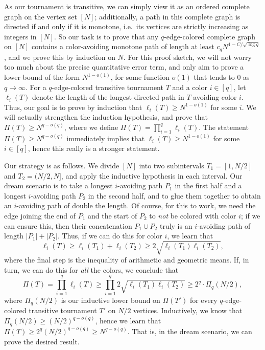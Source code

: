 \documentclass[11pt,reqno]{amsart}
\theoremstyle{definition}
\newcommand\ab[1]{\lvert#1\rvert}
\newcommand\1{\mathbf{1}}
\let\geq\geqslant
\begin{document}
As our tournament is transitive, we can simply view it as an ordered complete graph on the vertex set $[N]$; additionally, a path in this complete graph is directed if and only if it is monotone, i.e.\ its vertices are strictly increasing as integers in $[N]$. So our task is to prove that any $q$-edge-colored complete graph on $[N]$ contains a color-avoiding monotone path of length at least $c_q N^{1-C/\sqrt{\log q}}$, and we prove this by induction on $N$. For this proof sketch, we will not worry too much about the precise quantitative error term, and only aim to prove a lower bound of the form $N^{1-o(1)}$, for some function $o(1)$ that tends to $0$ as $q \to \infty$. For a $q$-edge-colored transitive tournament $T$ and a color $i \in [q]$, let $\ell_i(T)$ denote the length of the longest directed path in $T$ avoiding color $i$. Thus, our goal is to prove by induction that $\ell_i(T) \geq N^{1-o(1)}$ for some $i$. We will actually strengthen the induction hypothesis, and prove that $\Pi(T) \geq N^{q-o(q)}$, where we define $\Pi(T)=\prod_{i=1}^q \ell_i(T)$. The statement $\Pi(T) \geq N^{q-o(q)}$ immediately implies that $\ell_i(T) \geq N^{1-o(1)}$ for some $i \in [q]$, hence this really is a stronger statement.

Our strategy is as follows. We divide $[N]$ into two subintervals $T_1 = [1,N/2]$ and $T_2= (N/2,N]$, and apply the inductive hypothesis in each interval. Our dream scenario is to take a longest $i$-avoiding path $P_1$ in the first half and a longest $i$-avoiding path $P_2$ in the second half, and to glue them together to obtain an $i$-avoiding path of double the length. Of course, for this to work, we need the edge joining the end of $P_1$ and the start of $P_2$ to \emph{not} be colored with color $i$; if we can ensure this, then their concatenation $P_1 \cup P_2$ truly is an $i$-avoiding path of length $\ab{P_1}+\ab{P_2}$. Thus, if we can do this for color $i$, we learn that
\[
    \ell_i(T) \geq \ell_i(T_1)+\ell_i(T_2) \geq 2 \sqrt{\ell_i(T_1)\ell_i(T_2)},
\]
where the final step is the inequality of arithmetic and geometric means. If, in turn, we can do this for \emph{all} the colors, we conclude that
\[
    \Pi(T) =\prod_{i=1}^q \ell_i(T) \geq \prod_{i=1}^q 2\sqrt{\ell_i(T_1)\ell_i(T_2)} \geq 2^q \cdot \Pi_q(N/2),
\]
where $\Pi_q(N/2)$ is our inductive lower bound on $\Pi(T')$ for every $q$-edge-colored transitive tournament $T'$ on $N/2$ vertices. Inductively, we know that $\Pi_q(N/2)\geq (N/2)^{q-o(q)}$, hence we learn that $\Pi(T) \geq 2^q (N/2)^{q-o(q)} \geq N^{q-o(q)}$. That is, in the dream scenario, we can prove the desired result.
\end{document}
